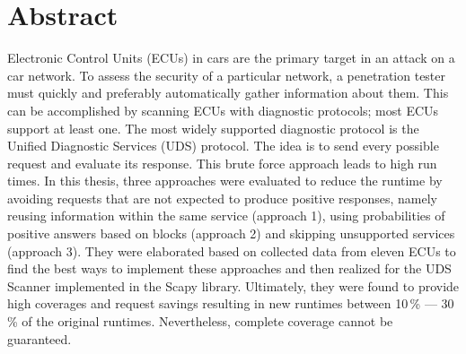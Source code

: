 \chapter*{\centering Abstract}

Electronic Control Units (ECUs) in cars are the primary target in an attack on a car network. To assess the security of a particular network, a penetration tester must quickly and preferably automatically gather information about them. This can be accomplished by scanning ECUs with diagnostic protocols; most ECUs support at least one. The most widely supported diagnostic protocol is the Unified Diagnostic Services (UDS) protocol. The idea is to send every possible request and evaluate its response. This brute force approach leads to high run times. In this thesis, three approaches were evaluated to reduce the runtime by avoiding requests that are not expected to produce positive responses, namely reusing information within the same service (approach 1), using probabilities of positive answers based on blocks (approach 2) and skipping unsupported services (approach 3). They were elaborated based on collected data from eleven ECUs to find the best ways to implement these approaches and then realized for the UDS Scanner implemented in the Scapy library. Ultimately, they were found to provide high coverages and request savings resulting in new runtimes between 10\,\% — 30\,\% of the original runtimes. Nevertheless, complete coverage cannot be guaranteed.
